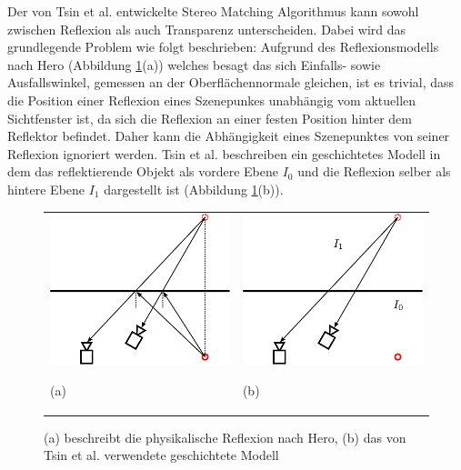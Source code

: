 \noindent
Der von Tsin et al. \cite{tsin2003stereo} entwickelte Stereo Matching Algorithmus kann sowohl zwischen Reflexion als auch Transparenz unterscheiden. Dabei wird das grundlegende Problem wie folgt beschrieben: Aufgrund des Reflexionsmodells nach Hero (Abbildung \ref{fig:reflection}(a)) welches besagt das sich Einfalls- sowie Ausfallswinkel, gemessen an der Oberflächennormale gleichen, ist es trivial, dass die Position einer Reflexion eines Szenepunkes unabhängig vom aktuellen Sichtfenster ist, da sich die Reflexion an einer festen Position hinter dem Reflektor befindet. Daher kann die Abhängigkeit eines Szenepunktes von seiner Reflexion ignoriert werden. Tsin et al. beschreiben ein geschichtetes Modell in dem das reflektierende Objekt als vordere Ebene $I_0$ und die Reflexion selber als hintere Ebene $I_1$ dargestellt ist (Abbildung \ref{fig:reflection}(b)).\\

\begin{figure}[h]
  	\centering
	\begin{tabular}{m{6.5cm} m{6.5cm}}
	\includegraphics[width=6.5cm]{img/reflection_model_hero.pdf}
	\begin{center} \small (a) \end{center}
	&
	\includegraphics[width=6.5cm]{img/reflection_model_layers.pdf}
	\begin{center} \small (b) \end{center}
	\end{tabular}
\caption{(a) beschreibt die physikalische Reflexion nach Hero, (b) das von Tsin et al. verwendete geschichtete Modell}
\label{fig:reflection}
\end{figure}

